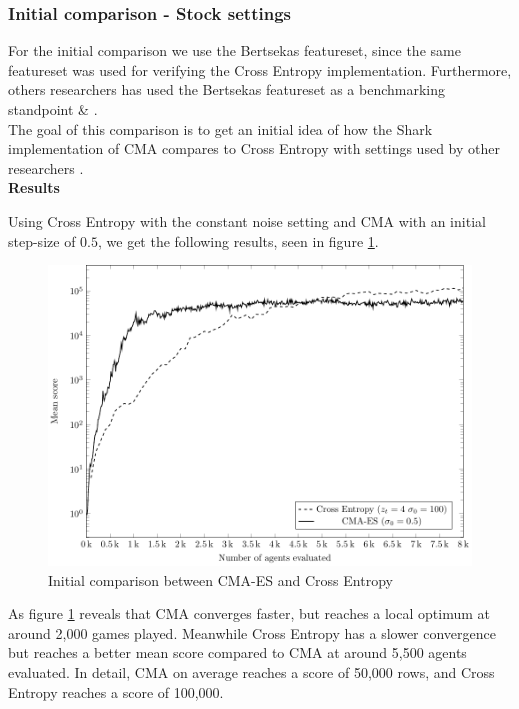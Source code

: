 \subsubsection{Initial comparison - Stock settings}
For the initial comparison we use the Bertsekas featureset, since the same featureset
was used for verifying the Cross Entropy implementation. Furthermore, others researchers
has used the Bertsekas featureset as a benchmarking standpoint \citep{thiery:09} \&
\citep{szita:06}.\\
The goal of this comparison is to get an initial idea of how the Shark implementation of
CMA compares to Cross Entropy with settings used by other researchers \citep{thiery:09}.\\

\textbf{Results}

Using Cross Entropy with the constant noise setting and CMA with an initial step-size
of $0.5$, we get the following results, seen in figure \ref{fig:CMA_VS_CE_00}.\\

\begin{figure}[H]
\includegraphics[scale=1]{plots/cmaCePlot}
\caption{Initial comparison between CMA-ES and Cross Entropy \label{fig:CMA_VS_CE_00}}
\end{figure}

As figure \ref{fig:CMA_VS_CE_00} reveals that CMA converges faster,
but reaches a local optimum at around 2,000 games played. Meanwhile Cross Entropy has a 
slower convergence but reaches a better mean score compared to CMA at around 5,500
agents evaluated. In detail, CMA on average reaches a score of 50,000 rows, and
Cross Entropy reaches a score of 100,000.\\

